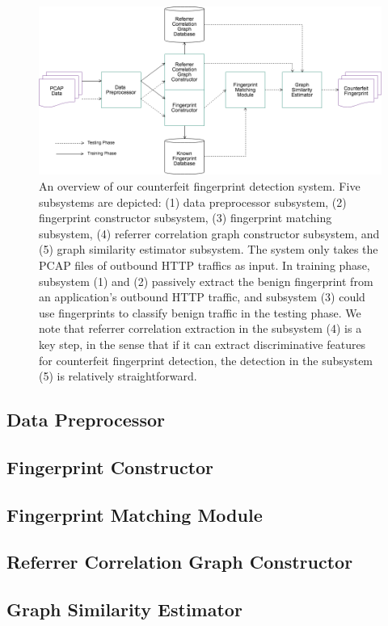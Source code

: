 \begin{figure}[!t]
\centering
\includegraphics[width=400pt]{image/sa.png}
\caption{An overview of our counterfeit fingerprint detection system. Five subsystems are depicted: (1) data preprocessor subsystem, (2) fingerprint constructor subsystem, (3) fingerprint matching subsystem, (4) referrer correlation graph constructor subsystem, and (5) graph similarity estimator subsystem. The system only takes the PCAP files of outbound HTTP traffics as input. In training phase, subsystem (1) and (2) passively extract the benign fingerprint from an application's outbound HTTP traffic, and subsystem (3) could use fingerprints to classify benign traffic in the testing phase. We note that referrer correlation extraction in the subsystem (4) is a key step, in the sense that if it can extract discriminative features for counterfeit fingerprint detection, the detection in the subsystem (5) is relatively straightforward.}
\label{fig:sa}
\end{figure}

\subsection{Data Preprocessor}

\subsection{Fingerprint Constructor}

\subsection{Fingerprint Matching Module}

\subsection{Referrer Correlation Graph Constructor}

\subsection{Graph Similarity Estimator}